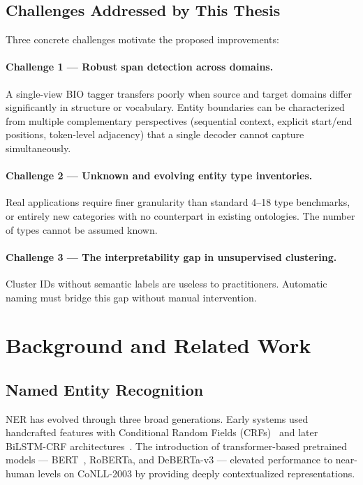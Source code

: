 \documentclass[11pt,a4paper]{article}
\begin{document}
\subsection{Challenges Addressed by This Thesis}

Three concrete challenges motivate the proposed improvements:

\paragraph{Challenge 1 — Robust span detection across domains.} A single-view BIO tagger transfers poorly when source and target domains differ significantly in structure or vocabulary. Entity boundaries can be characterized from multiple complementary perspectives (sequential context, explicit start/end positions, token-level adjacency) that a single decoder cannot capture simultaneously.

\paragraph{Challenge 2 — Unknown and evolving entity type inventories.} Real applications require finer granularity than standard 4–18 type benchmarks, or entirely new categories with no counterpart in existing ontologies. The number of types cannot be assumed known.

\paragraph{Challenge 3 — The interpretability gap in unsupervised clustering.} Cluster IDs without semantic labels are useless to practitioners. Automatic naming must bridge this gap without manual intervention.

\section{Background and Related Work}

\subsection{Named Entity Recognition}

NER has evolved through three broad generations. Early systems used handcrafted features with Conditional Random Fields (CRFs)~\cite{lafferty2001} and later BiLSTM-CRF architectures~\cite{mahovy2016}. The introduction of transformer-based pretrained models — BERT~\cite{devlin2019}, RoBERTa, and DeBERTa-v3 — elevated performance to near-human levels on CoNLL-2003 by providing deeply contextualized representations.
\end{document}
